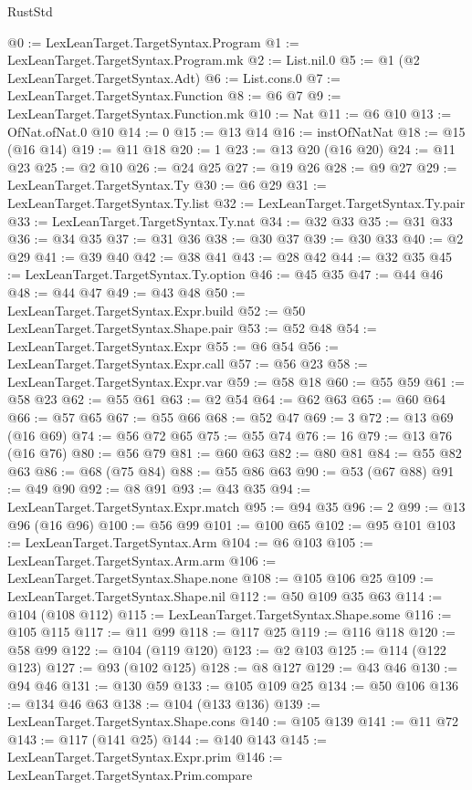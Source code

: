 \begin{lexlean}{RustStd}
\begin{coremodule}
@0 := LexLeanTarget.TargetSyntax.Program
@1 := LexLeanTarget.TargetSyntax.Program.mk
@2 := List.nil.{0}
@5 := @1 (@2 LexLeanTarget.TargetSyntax.Adt)
@6 := List.cons.{0}
@7 := LexLeanTarget.TargetSyntax.Function
@8 := @6 @7
@9 := LexLeanTarget.TargetSyntax.Function.mk
@10 := Nat
@11 := @6 @10
@13 := OfNat.ofNat.{0} @10
@14 := 0
@15 := @13 @14
@16 := instOfNatNat
@18 := @15 (@16 @14)
@19 := @11 @18
@20 := 1
@23 := @13 @20 (@16 @20)
@24 := @11 @23
@25 := @2 @10
@26 := @24 @25
@27 := @19 @26
@28 := @9 @27
@29 := LexLeanTarget.TargetSyntax.Ty
@30 := @6 @29
@31 := LexLeanTarget.TargetSyntax.Ty.list
@32 := LexLeanTarget.TargetSyntax.Ty.pair
@33 := LexLeanTarget.TargetSyntax.Ty.nat
@34 := @32 @33
@35 := @31 @33
@36 := @34 @35
@37 := @31 @36
@38 := @30 @37
@39 := @30 @33
@40 := @2 @29
@41 := @39 @40
@42 := @38 @41
@43 := @28 @42
@44 := @32 @35
@45 := LexLeanTarget.TargetSyntax.Ty.option
@46 := @45 @35
@47 := @44 @46
@48 := @44 @47
@49 := @43 @48
@50 := LexLeanTarget.TargetSyntax.Expr.build
@52 := @50 LexLeanTarget.TargetSyntax.Shape.pair
@53 := @52 @48
@54 := LexLeanTarget.TargetSyntax.Expr
@55 := @6 @54
@56 := LexLeanTarget.TargetSyntax.Expr.call
@57 := @56 @23
@58 := LexLeanTarget.TargetSyntax.Expr.var
@59 := @58 @18
@60 := @55 @59
@61 := @58 @23
@62 := @55 @61
@63 := @2 @54
@64 := @62 @63
@65 := @60 @64
@66 := @57 @65
@67 := @55 @66
@68 := @52 @47
@69 := 3
@72 := @13 @69 (@16 @69)
@74 := @56 @72 @65
@75 := @55 @74
@76 := 16
@79 := @13 @76 (@16 @76)
@80 := @56 @79
@81 := @60 @63
@82 := @80 @81
@84 := @55 @82 @63
@86 := @68 (@75 @84)
@88 := @55 @86 @63
@90 := @53 (@67 @88)
@91 := @49 @90
@92 := @8 @91
@93 := @43 @35
@94 := LexLeanTarget.TargetSyntax.Expr.match
@95 := @94 @35
@96 := 2
@99 := @13 @96 (@16 @96)
@100 := @56 @99
@101 := @100 @65
@102 := @95 @101
@103 := LexLeanTarget.TargetSyntax.Arm
@104 := @6 @103
@105 := LexLeanTarget.TargetSyntax.Arm.arm
@106 := LexLeanTarget.TargetSyntax.Shape.none
@108 := @105 @106 @25
@109 := LexLeanTarget.TargetSyntax.Shape.nil
@112 := @50 @109 @35 @63
@114 := @104 (@108 @112)
@115 := LexLeanTarget.TargetSyntax.Shape.some
@116 := @105 @115
@117 := @11 @99
@118 := @117 @25
@119 := @116 @118
@120 := @58 @99
@122 := @104 (@119 @120)
@123 := @2 @103
@125 := @114 (@122 @123)
@127 := @93 (@102 @125)
@128 := @8 @127
@129 := @43 @46
@130 := @94 @46
@131 := @130 @59
@133 := @105 @109 @25
@134 := @50 @106
@136 := @134 @46 @63
@138 := @104 (@133 @136)
@139 := LexLeanTarget.TargetSyntax.Shape.cons
@140 := @105 @139
@141 := @11 @72
@143 := @117 (@141 @25)
@144 := @140 @143
@145 := LexLeanTarget.TargetSyntax.Expr.prim
@146 := LexLeanTarget.TargetSyntax.Prim.compare

\end{coremodule}
\end{lexlean}

